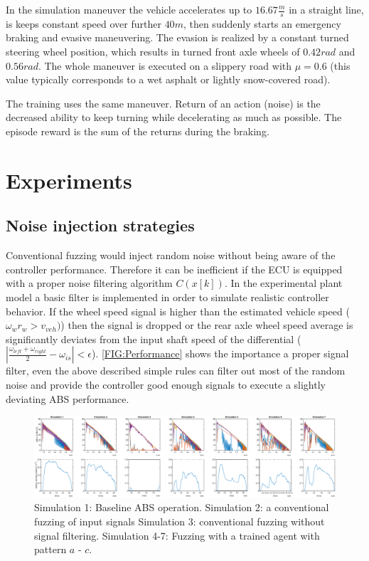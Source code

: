 \documentclass[a4paper, fleqn]{template/cas-dc}
\begin{document}
	In the simulation maneuver the vehicle accelerates up to $16.67\frac{m}{s}$ in a straight line, is keeps constant speed over further $40m$, then suddenly starts an emergency braking and evasive maneuvering. The evasion is realized by a constant turned steering wheel position, which results in turned front axle wheels of $0.42rad$ and $0.56rad$. The whole maneuver is executed on a slippery road with $\mu=0.6$ (this value typically corresponds to a wet asphalt or lightly snow-covered road).
	
	The training uses the same maneuver. Return of an action (noise) is the decreased ability to keep turning while decelerating as much as possible. The episode reward is the sum of the returns during the braking.
		
	\section{Experiments}
	\subsection{Noise injection strategies}	
	
	Conventional fuzzing would inject random noise without being aware of the controller performance. Therefore it can be inefficient if the ECU is equipped with a proper noise filtering algorithm $C(x[k])$. In the experimental plant model a basic filter is implemented in order to simulate realistic controller behavior. If the wheel speed signal is higher than the estimated vehicle speed ($\omega_{w}r_{w} > v_{veh})$) then the signal is dropped or the rear axle wheel speed average is significantly deviates from the input shaft speed of the differential ($|\frac{\omega_{left}+\omega_{right}}{2} - \omega_{is}| < \epsilon$). \autoref{FIG:Performance} shows the importance a proper signal filter, even the above described simple rules can filter out most of the random noise and provide the controller good enough signals to execute a slightly deviating ABS performance.
		
	\begin{figure}[ht]
		\centering
		\includegraphics[width=\textwidth]{figures/SAC_all_performance.pdf}
		\caption{Simulation 1: Baseline ABS operation. Simulation 2: a conventional fuzzing of input signals Simulation 3: conventional fuzzing without signal filtering. Simulation 4-7: Fuzzing with a trained agent with pattern $a$ - $c$.}
		\label{FIG:Performance}
	\end{figure}		
		
\end{document}
